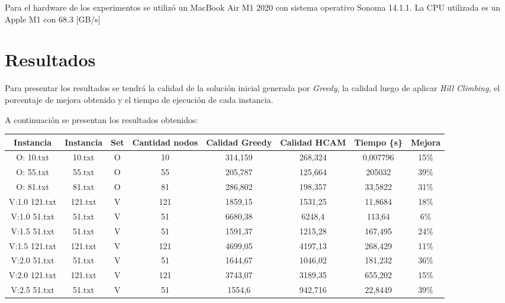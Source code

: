 \documentclass{article}
\begin{document}
Para el hardware de los experimentos se utilizó un MacBook Air M1 2020 con sistema operativo Sonoma 14.1.1. La CPU utilizada es un Apple M1 con 68.3 [GB/s]

\newpage
\section{Resultados}
Para presentar los resultados se tendrá la calidad de la solución inicial generada por \textit{Greedy}, la calidad luego de aplicar \textit{Hill Climbing}, el porcentaje de mejora obtenido y el tiempo de ejecución de cada instancia.

A continuación se presentan los resultados obtenidos:
\begin{table}[H]
    \small
    \begin{tabular}{|c|c|c|c|c|c|c|c|}
    \hline
    Instancia     & Instancia      & Set & Cantidad nodos & Calidad Greedy & Calidad HCAM & Tiempo \{s\} & Mejora \\ \hline
    O: 10.txt     & 10.txt         & O   & 10             & 314,159        & 268,324      & 0,007796     & 15\%   \\ \hline
    O: 55.txt     & 55.txt         & O   & 55             & 205,787        & 125,664      & 205032       & 39\%   \\ \hline
    O: 81.txt     & 81.txt         & O   & 81             & 286,802        & 198,357      & 33,5822      & 31\%   \\ \hline
    V:1.0 121.txt & 121.txt        & V   & 121            & 1859,15        & 1531,25      & 11,8684      & 18\%   \\ \hline
    V:1.0 51.txt  & 51.txt         & V   & 51             & 6680,38        & 6248,4       & 113,64       & 6\%    \\ \hline
    V:1.5 51.txt  & 51.txt         & V   & 51             & 1591,37        & 1215,28      & 167,495      & 24\%   \\ \hline
    V:1.5 121.txt & 121.txt        & V   & 121            & 4699,05        & 4197,13      & 268,429      & 11\%   \\ \hline
    V:2.0 51.txt  & 51.txt         & V   & 51             & 1644,67        & 1046,02      & 181,232      & 36\%   \\ \hline
    V:2.0 121.txt & 121.txt        & V   & 121            & 3743,07        & 3189,35      & 655,202      & 15\%   \\ \hline
    V:2.5 51.txt  & 51.txt         & V   & 51             & 1554,6         & 942,716      & 22,8449      & 39\%   \\ \hline

\end{tabular}
\end{table}
\end{document}

